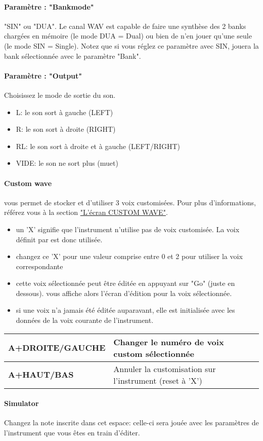 \paragraph{Paramètre : "Bankmode"} "SIN" ou "DUA".
Le canal WAV est capable de faire une synthèse des 2 banks chargées en mémoire (le mode DUA = Dual) ou bien de n'en jouer qu'une seule (le mode SIN = Single).
Notez que si vous réglez ce paramètre avec SIN, \FAT jouera la bank sélectionnée avec le paramètre "Bank".

\paragraph{Paramètre : "Output"} Choisissez le mode de sortie du son.
\medskip

\begin{itemize}
    \item{L: le son sort à gauche (LEFT)}
    \item{R: le son sort à droite (RIGHT)}
    \item{RL: le son sort à droite et à gauche (LEFT/RIGHT)}
    \item{VIDE: le son ne sort plus (muet)}
\end{itemize}

\paragraph{Custom wave} \FAT vous permet de stocker et d'utiliser 3 voix customisées.
Pour plus d'informations, référez vous à la section \hyperref[subsec:customwave]{"L'écran CUSTOM WAVE"}.
\medskip

\begin{itemize}
  \item{un 'X' signifie que l'instrument n'utilise pas de voix customisée. La voix définit par \FAT est donc utilisée.}
  \item{changez ce 'X' pour une valeur comprise entre 0 et 2 pour utiliser la voix correspondante}
  \item{cette voix sélectionnée peut être éditée en appuyant sur "Go" (juste en dessous). \FAT vous affiche alors l'écran d'édition pour la voix sélectionnée.}
  \item{si une voix n'a jamais été éditée auparavant, elle est initialisée avec les données de la voix courante de l'instrument.}
\end{itemize}\medskip

\tablelasttail{\hline}
\begin{supertabular}{|l|p{11cm}|}
    \hline
    {\bf A+DROITE/GAUCHE} & Changer le numéro de voix custom sélectionnée \\
    \hline
    {\bf A+HAUT/BAS} & Annuler la customisation sur l'instrument (reset à 'X') \\
\hline
\end{supertabular}
\medskip

\paragraph{Simulator} Changez la note inscrite dans cet espace:
    celle-ci sera jouée avec les paramètres de l'instrument que vous êtes en train d'éditer.
